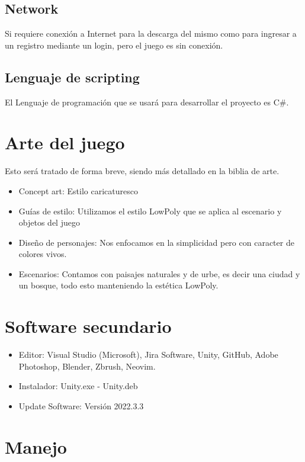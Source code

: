 \subsection{Network}
Si requiere conexión a Internet para la descarga del mismo como para ingresar a un registro mediante
un login, pero el juego es sin conexión.
\subsection{Lenguaje de scripting}
El Lenguaje de programación que se usará para desarrollar el proyecto es C\#.

\section{Arte del juego}

Esto será tratado de forma breve, siendo más detallado en la biblia de arte.

\begin{itemize}
	\item Concept art: Estilo caricaturesco
	\item Guías de estilo: Utilizamos el estilo LowPoly que se aplica al escenario y objetos del juego
	\item Diseño de personajes: Nos enfocamos en la simplicidad pero con caracter de colores vivos.
	\item Escenarios: Contamos con paisajes naturales y de urbe, es decir una ciudad y un bosque, todo esto
	      manteniendo la estética LowPoly.
\end{itemize}

\section{Software secundario}
\begin{itemize}
	\item Editor: Visual Studio (Microsoft), Jira Software, Unity, GitHub, Adobe Photoshop, Blender, Zbrush,
	      Neovim.
	\item Instalador: Unity.exe - Unity.deb
	\item Update Software: Versión 2022.3.3
\end{itemize}

\section{Manejo}
